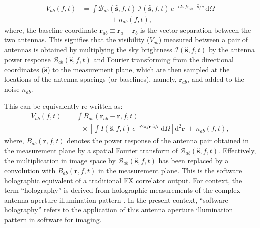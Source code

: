 \documentclass[a4paper,fleqn,usenatbib]{mnras}
\newcommand{\dif}{\mathrm{d}}
\begin{document}
\begin{align}\label{eqn:measurement-eqn-1}
  V_{ab}(f,t) &= \int \mathcal{B}_{ab}(\hat{\mathbf{s}},f,t)\,\mathcal{I}(\hat{\mathbf{s}},f,t)\,e^{-i 2\pi f\mathbf{r}_{ab}\!\cdot\,\hat{\mathbf{s}}/c}\,\dif\Omega \nonumber\\
  &\qquad\qquad + n_{ab}(f,t),
\end{align}
where, the baseline coordinate $\mathbf{r}_{ab}\equiv\mathbf{r}_a-\mathbf{r}_b$ is the vector separation between the two antennas. This signifies that the visibility ($V_{ab}$) measured between a pair of antennas is obtained by multiplying the sky brightness $\mathcal{I}(\hat{\mathbf{s}},f,t)$ by the antenna power response $\mathcal{B}_{ab}(\hat{\mathbf{s}},f,t)$ and Fourier transforming from the directional coordinates ($\hat{\mathbf{s}}$) to the measurement plane, which are then sampled at the locations of the antenna spacings (or baselines), namely, $\mathbf{r}_{ab}$, and added to the noise $n_{ab}$. 

This can be equivalently re-written as:
\begin{align}\label{eqn:software-holography}
  V_{ab}(f,t) &= \int B_{ab}(\mathbf{r}_{ab}-\mathbf{r},f,t) \nonumber\\ 
              &\qquad \times \left[\int I(\hat{\mathbf{s}},f,t)\,e^{-i 2\pi f\mathbf{r}.\hat{\mathbf{s}}/c}\,\dif\Omega\right]\dif^2\mathbf{r}\,+\, n_{ab}(f,t),
\end{align}
where, $B_{ab}(\mathbf{r},f,t)$ denotes the power response of the antenna pair obtained in the measurement plane by a spatial Fourier transform of $\mathcal{B}_{ab}(\hat{\mathbf{s}},f,t)$. Effectively, the multiplication in image space by $\mathcal{B}_{ab}(\hat{\mathbf{s}},f,t)$ has been replaced by a convolution with $B_{ab}(\mathbf{r},f,t)$ in the measurement plane. This is the software holographic equivalent of a traditional FX correlator output. For context, the term ``holography'' is derived from holographic measurements of the complex antenna aperture illumination pattern \citep{ben76,sco77}. In the present context, ``software holography'' refers to the application of this antenna aperture illumination pattern in software for imaging.
\end{document}
